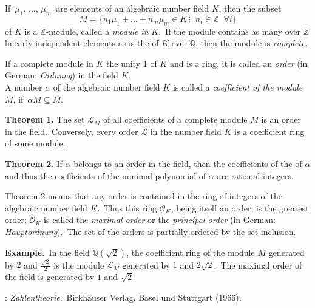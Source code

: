 \documentclass[12pt]{article}
\theoremstyle{definition}
\begin{document}

If\, $\mu_1,\,\ldots,\,\mu_m$\, are elements of an algebraic number field $K$, then the subset 
$$M = 
 \{n_1\mu_1+\ldots+n_m\mu_m\in K\,\vdots\;\; n_i\in\mathbb{Z}\;\;\forall i\}$$
of $K$ is a $\mathbb{Z}$-module, called a {\em module in} $K$.\, If the module contains as many over $\mathbb{Z}$ linearly independent elements as is the  of $K$ over $\mathbb{Q}$, then the module is {\em complete}.

If a complete module in $K$  the unity 1 of $K$ and is a ring, it is called an {\em order} (in German: {\em Ordnung}) in the field $K$.\\

A number $\alpha$ of the algebraic number field $K$ is called a {\em coefficient of the module} $M$, if\, $\alpha M \subseteq M$.\, 

\textbf{Theorem 1.}\; The set $\mathcal{L}_M$ of all coefficients of a complete module $M$ is an order in the field.\, Conversely, every order $\mathcal{L}$ in the number field $K$ is a coefficient ring of some module.

\textbf{Theorem 2.}\; If $\alpha$ belongs to an order in the field, then the coefficients of the  of $\alpha$ and thus the coefficients of the minimal polynomial of $\alpha$ are rational integers.

Theorem 2 means that any order is contained in the ring of integers of the algebraic number field $K$.\, Thus this ring $\mathcal{O}_K$, being itself an order, is the greatest order; $\mathcal{O}_K$ is called the {\em maximal order} or the {\em principal order} (in German: {\em Hauptordnung}).\, The set of the orders is partially ordered by the set inclusion.

\textbf{Example.}\, In the field $\mathbb{Q}(\sqrt{2})$, the coefficient ring of the module $M$ generated by $2$ and $\frac{\sqrt{2}}{2}$ is the module $\mathcal{L}_M$ generated by $1$ and $2\sqrt{2}$.\, The maximal order of the field is generated by $1$ and $\sqrt{2}$.

\begin{thebibliography}{9}
: {\em Zahlentheorie}.\, Birkh\"auser Verlag. Basel und Stuttgart (1966).
\end{thebibliography}

\end{document}
